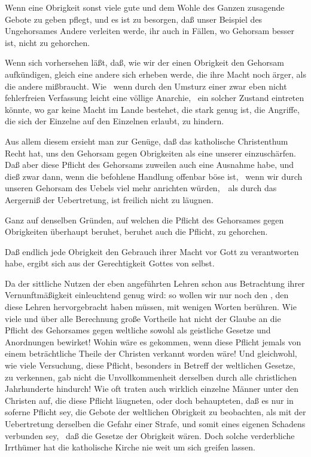\begin{aufza}
\begin{aufzb}
\item Wenn eine Obrigkeit sonst viele gute und dem Wohle des Ganzen zusagende Gebote zu geben pflegt, und es ist zu besorgen, daß unser Beispiel des Ungehorsames Andere verleiten werde, ihr auch in Fällen, wo Gehorsam besser ist, nicht zu gehorchen.
\item Wenn sich vorhersehen läßt, daß, wie wir der einen Obrigkeit den Gehorsam aufkündigen, gleich eine andere sich erheben werde, die ihre Macht noch ärger, als die andere mißbraucht. Wie \zB\  wenn durch den Umsturz einer zwar eben nicht fehlerfreien Verfassung leicht eine völlige Anarchie, \dh\  ein solcher Zustand eintreten könnte, wo gar keine Macht im Lande bestehet, die stark genug ist, die Angriffe, die sich der Einzelne auf den Einzelnen erlaubt, zu hindern. \Usw\
\end{aufzb}
Aus allem diesem ersieht man zur Genüge, daß das katholische Christenthum Recht hat, uns den Gehorsam gegen Obrigkeiten als eine unserer  einzuschärfen. Daß aber diese Pflicht des Gehorsams zuweilen auch eine Ausnahme habe, und dieß zwar dann, wenn die befohlene Handlung offenbar böse ist, \dh\  wenn wir durch unseren Gehorsam des Uebels viel mehr anrichten würden,~\ als durch das Aergerniß der Uebertretung, ist freilich nicht zu läugnen.
\item Ganz auf denselben Gründen, auf welchen die Pflicht des Gehorsames gegen Obrigkeiten überhaupt beruhet, beruhet auch die Pflicht, \RWbet{geistlichen Obrigkeiten} zu gehorchen.
\item Daß endlich jede Obrigkeit den Gebrauch ihrer Macht vor Gott zu verantworten habe, ergibt sich aus der Gerechtigkeit Gottes von selbst.
\end{aufza}

Da der sittliche Nutzen der eben angeführten Lehren schon aus Betrachtung ihrer Vernunftmäßigkeit einleuchtend genug wird: so wollen wir nur noch den , den diese Lehren hervorgebracht haben müssen, mit wenigen Worten berühren. Wie viele und über alle Berechnung große Vortheile hat nicht der Glaube an die Pflicht des Gehorsames gegen weltliche sowohl als geistliche Gesetze und Anordnungen bewirket! Wohin wäre es gekommen, wenn diese Pflicht jemals von einem beträchtliche Theile der Christen verkannt worden wäre! Und gleichwohl, wie viele Versuchung, diese Pflicht, besonders in Betreff der weltlichen Gesetze, zu verkennen, gab nicht die Unvollkommenheit derselben durch alle christlichen Jahrhunderte hindurch! Wie oft traten auch wirklich einzelne Männer unter den Christen auf, die diese Pflicht läugneten, oder doch behaupteten, daß es nur in soferne Pflicht sey, die Gebote der weltlichen Obrigkeit zu beobachten, als mit der Uebertretung derselben die Gefahr einer Strafe, und somit eines eigenen Schadens verbunden sey, \dh\  daß die Gesetze der Obrigkeit  wären. Doch solche verderbliche Irrthümer hat die katholische Kirche nie weit um sich greifen lassen.

